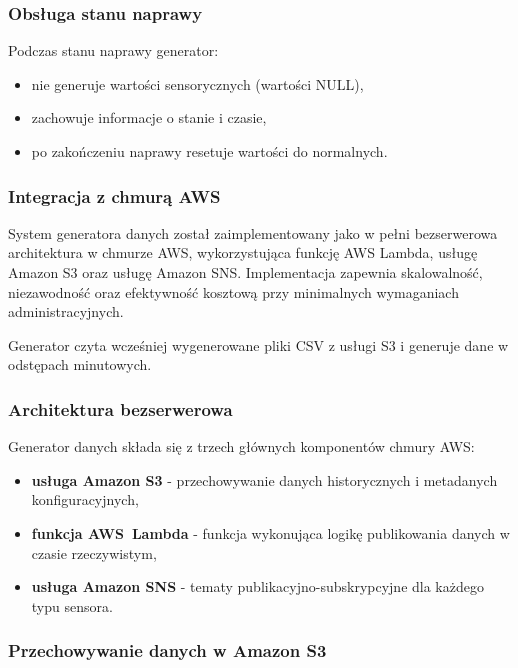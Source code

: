 \subsubsection{Obsługa stanu naprawy}

Podczas stanu naprawy generator:
\begin{itemize}
    \item nie generuje wartości sensorycznych (wartości NULL),
    \item zachowuje informacje o stanie i czasie,
    \item po zakończeniu naprawy resetuje wartości do normalnych.
\end{itemize}

\subsubsection{Integracja z chmurą AWS}
\label{sec:integracja_aws}

System generatora danych został zaimplementowany jako w pełni bezserwerowa architektura w chmurze AWS, wykorzystująca funkcję AWS Lambda, usługę Amazon S3 oraz usługę Amazon SNS. Implementacja zapewnia skalowalność, niezawodność oraz efektywność kosztową przy minimalnych wymaganiach administracyjnych.

Generator czyta wcześniej wygenerowane pliki CSV z usługi S3 i generuje dane w odstępach minutowych.

\subsubsection{Architektura bezserwerowa}
\label{subsec:architektura_bezserwerowa}

Generator danych składa się z trzech głównych komponentów chmury AWS:

\begin{itemize}
    \item \textbf{usługa Amazon S3} - przechowywanie danych historycznych i metadanych konfiguracyjnych,
    \item \textbf{funkcja \mbox{AWS Lambda}} - funkcja wykonująca logikę publikowania danych w czasie rzeczywistym,
    \item \textbf{usługa \textbf{Amazon SNS}} - tematy publikacyjno-subskrypcyjne dla każdego typu sensora.
\end{itemize}

\subsubsection{Przechowywanie danych w Amazon S3}
\label{subsec:amazon_s3}

